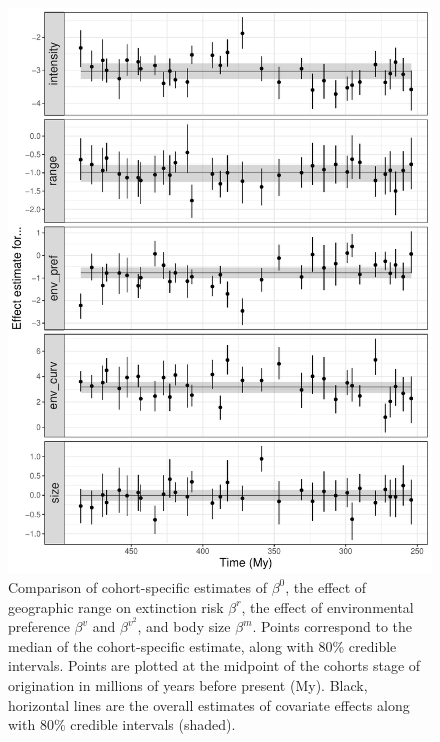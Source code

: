 \documentclass[11pt]{article}
\begin{document}
\begin{figure}[ht]
  \centering
  \includegraphics[width = \textwidth,height = 0.8\textheight,keepaspectratio=true]{figure/cohort_series_cweib_cens}
  \caption{Comparison of cohort-specific estimates of \(\beta^{0}\), the effect of geographic range on extinction risk \(\beta^{r}\), the effect of environmental preference \(\beta^{v}\) and \(\beta^{v^{2}}\), and body size \(\beta^{m}\). Points correspond to the median of the cohort-specific estimate, along with 80\% credible intervals. Points are plotted at the midpoint of the cohorts stage of origination in millions of years before present (My). Black, horizontal lines are the overall estimates of covariate effects along with 80\% credible intervals (shaded).}
  \label{fig:cohort_series}
\end{figure}
\end{document}
